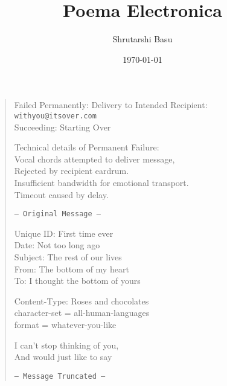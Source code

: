 \documentclass[11pt,letterpaper]{article}
\title{Poema Electronica}
\author{Shrutarshi Basu}
\date{\today}
\begin{document}
\maketitle
\begin{verse}
Failed Permanently: Delivery to Intended Recipient:\\
\texttt{withyou@itsover.com}\\
Succeeding: Starting Over

Technical details of Permanent Failure:\\
Vocal chords attempted to deliver message,\\
Rejected by recipient eardrum.\\
Insufficient bandwidth for emotional transport.\\
Timeout caused by delay.

\texttt{--- Original Message ---}

Unique ID: First time ever\\
Date: Not too long ago\\
Subject: The rest of our lives\\
From: The bottom of my heart\\
To: I thought the bottom of yours

Content-Type: Roses and chocolates\\
character-set = all-human-languages\\
format = whatever-you-like

I can't stop thinking of you,\\
And would just like to say

\texttt{--- Message Truncated ---\\}
\end{verse}

\end{document}
